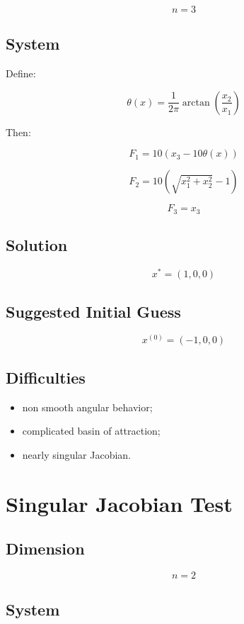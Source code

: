 \documentclass[11pt,a4paper]{article}
\begin{document}
\[
n=3
\]

\subsection*{System}

Define:

\[
\theta(x)=
\frac{1}{2\pi}
\arctan\left(\frac{x_2}{x_1}\right)
\]

Then:

\[
F_1=10(x_3-10\theta(x))
\]

\[
F_2=10(\sqrt{x_1^2+x_2^2}-1)
\]

\[
F_3=x_3
\]

\subsection*{Solution}

\[
x^*=(1,0,0)
\]

\subsection*{Suggested Initial Guess}

\[
x^{(0)}=(-1,0,0)
\]

\subsection*{Difficulties}

\begin{itemize}
  \item non smooth angular behavior;
  \item complicated basin of attraction;
  \item nearly singular Jacobian.
\end{itemize}

\section{Singular Jacobian Test}

\subsection*{Dimension}

\[
n=2
\]

\subsection*{System}
\end{document}
